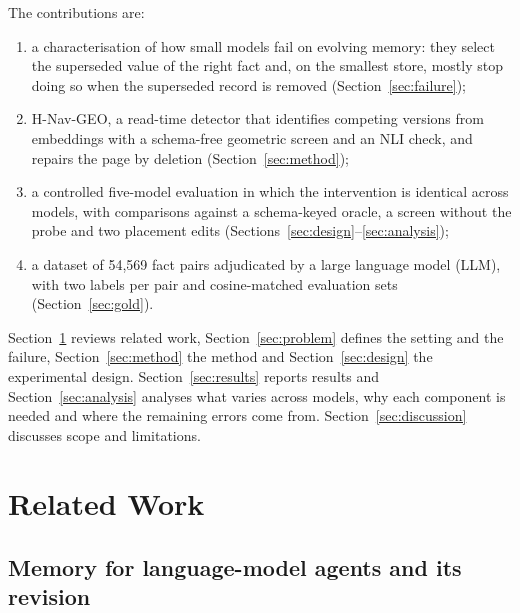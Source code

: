 \documentclass{CUP-JNL-NLP}
\newcommand{\geo}{H-Nav-GEO}
\begin{document}
The contributions are:
\begin{enumerate}
  \item a characterisation of how small models fail on evolving memory: they select the superseded value of the right fact and, on the smallest store, mostly stop doing so when the superseded record is removed (Section~\ref{sec:failure});
  \item \geo{}, a read-time detector that identifies competing versions from embeddings with a schema-free geometric screen and an NLI check, and repairs the page by deletion (Section~\ref{sec:method});
  \item a controlled five-model evaluation in which the intervention is identical across models, with comparisons against a schema-keyed oracle, a screen without the probe and two placement edits (Sections~\ref{sec:design}--\ref{sec:analysis});
  \item a dataset of 54,569 fact pairs adjudicated by a large language model (LLM), with two labels per pair and cosine-matched evaluation sets (Section~\ref{sec:gold}).
\end{enumerate}

Section~\ref{sec:related} reviews related work, Section~\ref{sec:problem} defines the setting and the failure, Section~\ref{sec:method} the method and Section~\ref{sec:design} the experimental design. Section~\ref{sec:results} reports results and Section~\ref{sec:analysis} analyses what varies across models, why each component is needed and where the remaining errors come from. Section~\ref{sec:discussion} discusses scope and limitations.

\section{Related Work}
\label{sec:related}

\subsection{Memory for language-model agents and its revision}
\label{sec:related-memory}
\end{document}
